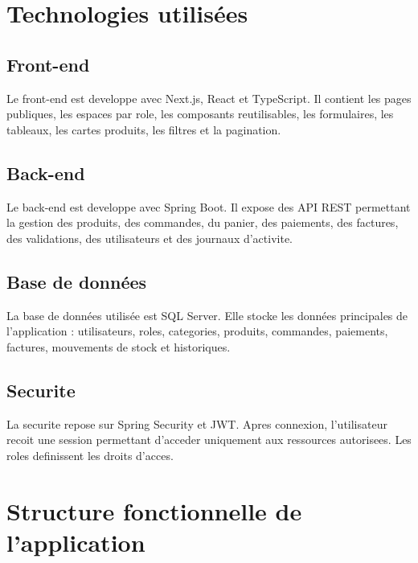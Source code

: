 \documentclass[12pt,a4paper]{report}
\begin{document}
\section{Technologies utilisées}

\subsection{Front-end}

Le front-end est developpe avec Next.js, React et TypeScript. Il contient les pages publiques, les espaces par role, les composants reutilisables, les formulaires, les tableaux, les cartes produits, les filtres et la pagination.

\subsection{Back-end}

Le back-end est developpe avec Spring Boot. Il expose des API REST permettant la gestion des produits, des commandes, du panier, des paiements, des factures, des validations, des utilisateurs et des journaux d'activite.

\subsection{Base de données}

La base de données utilisée est SQL Server. Elle stocke les données principales de l'application : utilisateurs, roles, categories, produits, commandes, paiements, factures, mouvements de stock et historiques.

\subsection{Securite}

La securite repose sur Spring Security et JWT. Apres connexion, l'utilisateur recoit une session permettant d'acceder uniquement aux ressources autorisees. Les roles definissent les droits d'acces.

\section{Structure fonctionnelle de l'application}
\end{document}
